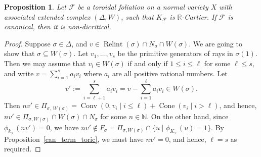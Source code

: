 \documentclass[12pt,reqno]{amsart}
\newtheorem{proposition}[theorem]{Proposition}
\theoremstyle{definition}
\newcommand{\on}{\operatorname}
\newcommand\cF{{\mathcal{F}}}
\newcommand\bN{{\mathbb N}}
\newcommand\bR{{\mathbb R}}
\begin{document}
\begin{proposition}\label{CanImplyND}
    Let $\cF$ be a toroidal foliation on a normal variety $X$ with associated extended complex $(\Delta,W)$, such that $K_\cF$ is $\bR$-Cartier. 
    If $\cF$ is canonical, then it is non-dicritical. 
\end{proposition}
\begin{proof}
    Suppose $\sigma\in\Delta$, and $v\in\on{Relint}(\sigma)\cap N_\sigma\cap W(\sigma)$. We are going to show that $\sigma\subseteq W(\sigma)$. Let $v_1,\ldots,v_s$ be the primitive generators of rays in $\sigma(1)$. Then we may assume that $v_i\in W(\sigma)$ if and only if $1\leq i\leq \ell$ for some $\ell\leq s$, and write $v=\sum_{i=1}^s a_iv_i$ where $a_i$ are all positive rational numbers. Let
    \[
        v':=\sum_{i=\ell+1}^sa_iv_i=v-\sum_{i=1}^\ell a_iv_i\in W(\sigma).
    \]
    Then $nv'\in \Pi_{\sigma,\,W(\sigma)} = \on{Conv}(0,v_i\mid i\leq\ell)+\on{Cone}(v_i\mid i>\ell)$, and hence, $nv'\in\Pi_{\sigma,W(\sigma)}\cap W(\sigma)\cap N_\sigma$ for some $n\in\bN$. On the other hand, since $\phi_{k_\cF}(nv')=0$, we have $nv'\not\in F_\sigma=\Pi_{\sigma,W(\sigma)}\cap\{u\mid\phi_{K_\cF}(u)=1\}$. By Proposition~\ref{can_term_toric}, we must have $nv'=0$, and hence, $\ell=s$ as required.
\end{proof}
\end{document}
